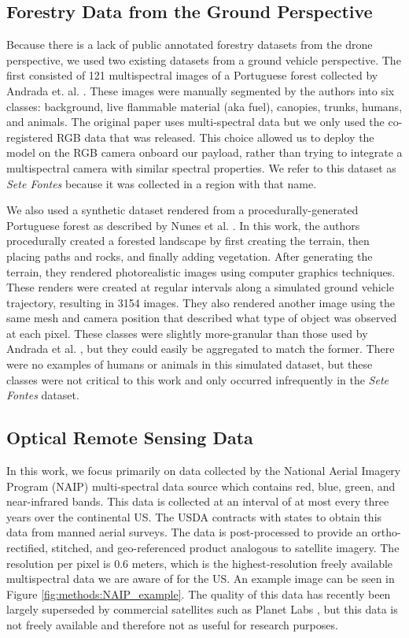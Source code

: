 \subsection{Forestry Data from the Ground Perspective}
Because there is a lack of public annotated forestry datasets from the drone perspective, we used two existing datasets from a ground vehicle perspective. The first consisted of 121 multispectral images of a Portuguese forest collected by Andrada et. al. \cite{Andrada2020}. These images were manually segmented by the authors into six classes: background, live flammable material (aka fuel), canopies, trunks, humans, and animals. The original paper uses multi-spectral data but we only used the co-registered RGB data that was released. This choice allowed us to deploy the model on the RGB camera onboard our payload, rather than trying to integrate a multispectral camera with similar spectral properties. We refer to this dataset as \textit{Sete Fontes} because it was collected in a region with that name.

We also used a synthetic dataset rendered from a procedurally-generated Portuguese forest as described by Nunes et al. \cite{nunes2021procedural}. In this work, the authors procedurally created a forested landscape by first creating the terrain, then placing paths and rocks, and finally adding vegetation. After generating the terrain, they rendered photorealistic images using computer graphics techniques. These renders were created at regular intervals along a simulated ground vehicle trajectory, resulting in 3154 images. They also rendered another image using the same mesh and camera position that described what type of object was observed at each pixel. These classes were slightly more-granular than those used by Andrada et al. \cite{Andrada2020}, but they could easily be aggregated to match the former. There were no examples of humans or animals in this simulated dataset, but these classes were not critical to this work and only occurred infrequently in the \textit{Sete Fontes} dataset. 

\subsection{Optical Remote Sensing Data}
In this work, we focus primarily on data collected by the National Aerial Imagery Program (NAIP) multi-spectral data source which contains red, blue, green, and near-infrared bands. This data is collected at an interval of at most every three years over the continental US. The USDA contracts with states to obtain this data from manned aerial surveys. The data is post-processed to provide an ortho-rectified, stitched, and geo-referenced product analogous to satellite imagery. The resolution per pixel is 0.6 meters, which is the highest-resolution freely available multispectral data we are aware of for the US. An example image can be seen in Figure \ref{fig:methods:NAIP_example}. The quality of this data has recently been largely superseded by commercial satellites such as Planet Labs \cite{Planet}, but this data is not freely available and therefore not as useful for research purposes. 

